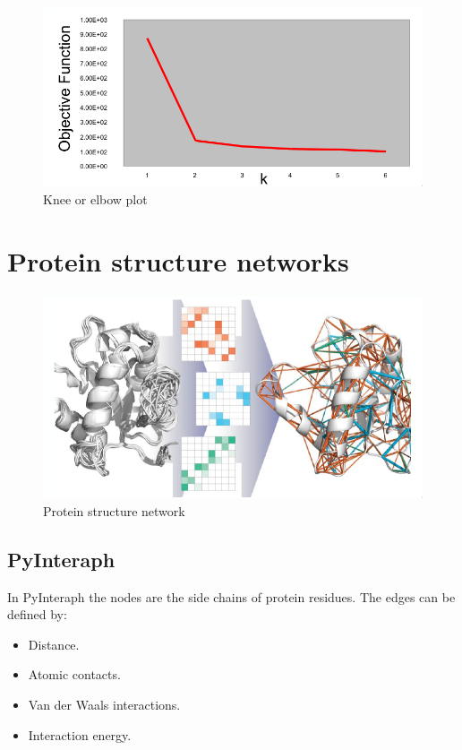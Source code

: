 	\begin{figure}[H]
		\includegraphics[width=\textwidth]{elbow}
		\caption{Knee or elbow plot}
		\label{fig:elbow}
	\end{figure}

\section{Protein structure networks}

\begin{figure}[H]
	\includegraphics[width=\textwidth]{psn}
	\caption{Protein structure network}
	\label{fig:psn}
\end{figure}

	\subsection{PyInteraph}
	In PyInteraph the nodes are the side chains of protein residues.
	The edges can be defined by:

	\begin{multicols}{2}
		\begin{itemize}
			\item Distance.
			\item Atomic contacts.
			\item Van der Waals interactions.
			\item Interaction energy.
		\end{itemize}
	\end{multicols}

